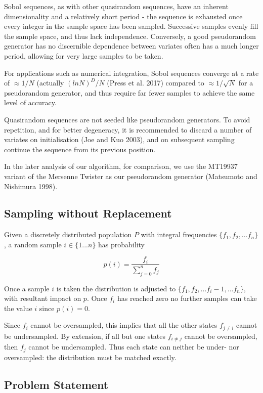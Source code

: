 \documentclass[]{article}
\begin{document}
Sobol sequences, as with other quasirandom sequences, have an inherent
dimensionality and a relatively short period - the sequence is exhausted
once every integer in the sample space has been sampled. Successive
samples evenly fill the sample space, and thus lack independence.
Conversely, a good pseudorandom generator has no discernible dependence
between variates often has a much longer period, allowing for very large
samples to be taken.

For applications such as numerical integration, Sobol sequences converge
at a rate of \(\approx1/N\) (actually \((ln N)^D/N\) (Press et al. 2017)
compared to \(\approx1/\sqrt N\) for a pseudorandom generator, and thus
require far fewer samples to achieve the same level of accuracy.

Quasirandom sequences are not seeded like pseudorandom generators. To
avoid repetition, and for better degeneracy, it is recommended to
discard a number of variates on initialisation (Joe and Kuo 2003), and
on subsequent sampling continue the sequence from its previous position.

In the later analysis of our algorithm, for comparison, we use the
MT19937 variant of the Mersenne Twister as our pseudorandom generator
(Matsumoto and Nishimura 1998).

\subsection{Sampling without
Replacement}\label{sampling-without-replacement}

Given a discretely distributed population \(P\) with integral frequencies
\(\{f_1,f_2,...f_n\}\), a random sample \(i \in \{1...n\}\) has
probability

\[p(i) = \frac{f_i}{\sum\limits_{j=0}^{n}f_j}\]

Once a sample \(i\) is taken the distribution is adjusted to
\(\{f_1,f_2,...f_i-1,...f_n\}\), with resultant impact on \(p\). Once
\(f_i\) has reached zero no further samples can take the value \(i\)
since \(p(i) = 0\).

Since \(f_i\) cannot be oversampled, this implies that all the other
states \(f_{j\neq{i}}\) cannot be undersampled. By extension, if all but
one states \(f_{i\neq{j}}\) cannot be oversampled, then \(f_j\) cannot
be undersampled. Thus each state can neither be under- nor oversampled:
the distribution must be matched exactly.

\subsection{Problem Statement}\label{problem-statement}
\end{document}
